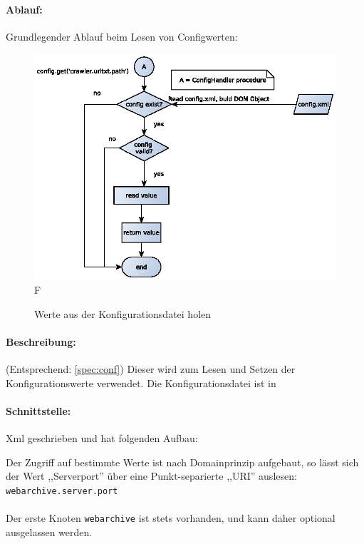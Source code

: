 \paragraph{Ablauf:}
\label{par:ablauf_}
Grundlegender Ablauf beim Lesen von Configwerten:
\begin{figure}[h]
	\centering
	\label{dia:design:backend:overview}
	\includegraphics[width=\textwidth]{design/backend/gfx/getting_value.eps}F
	\caption{Werte aus der Konfigurationsdatei holen}
\end{figure}

\paragraph{Beschreibung:}
(Entsprechend: \ref{spec:conf})
\label{par:beschreibung_}
Dieser wird zum Lesen und Setzen der Konfigurationswerte verwendet. Die Konfigurationsdatei ist in 
\paragraph{Schnittstelle:}
\label{par:schnittstelle_}
Xml geschrieben und hat folgenden Aufbau:
    
Der Zugriff auf bestimmte Werte ist nach Domainprinzip aufgebaut, so
lässt sich der Wert ,,Serverport'' über eine Punkt-separierte ,,URI'' auslesen: \texttt{webarchive.server.port} 
\\ \\
Der erste Knoten \texttt{webarchive} ist stets vorhanden, und kann daher optional ausgelassen werden.

